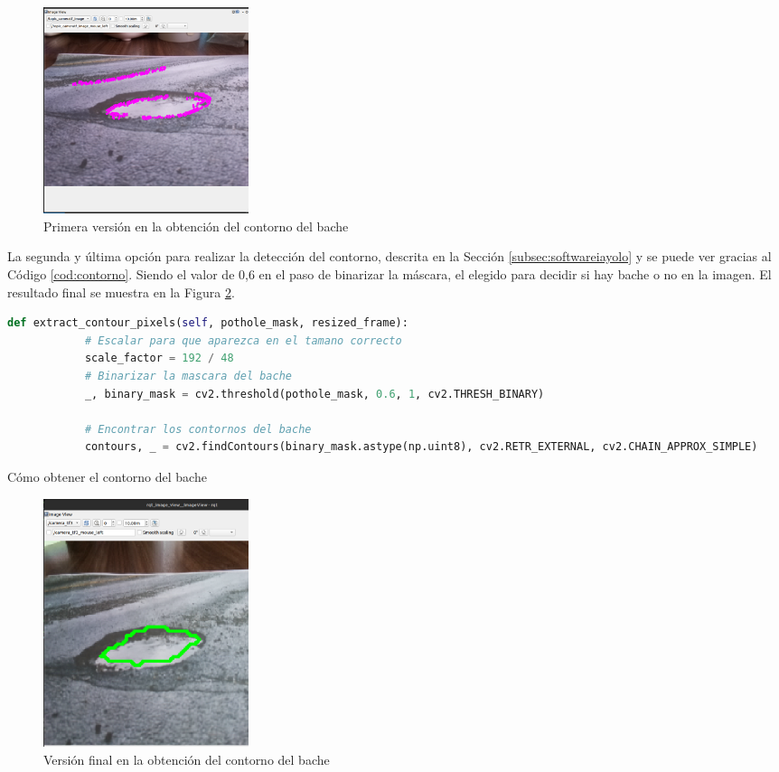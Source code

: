 \begin{figure} [h!]
	\begin{center}
			\includegraphics[width=6cm]{figs/cap7/contornoerror.png}
		\end{center}
	\caption{Primera versión en la obtención del contorno del bache}
	\label{fig:contornoerror}
\end{figure}

La segunda y última opción para realizar la detección del contorno, descrita en la Sección \ref{subsec:softwareiayolo} y se puede ver gracias al Código \ref{cod:contorno}. Siendo el valor de 0,6 en el paso de binarizar la máscara, el elegido para decidir si hay bache o no en la imagen. El resultado final se muestra en la Figura \ref{fig:contornobien}.

\begin{code}[h]
	\begin{lstlisting}[language=Python]
		def extract_contour_pixels(self, pothole_mask, resized_frame):
			# Escalar para que aparezca en el tamano correcto
			scale_factor = 192 / 48
			# Binarizar la mascara del bache
			_, binary_mask = cv2.threshold(pothole_mask, 0.6, 1, cv2.THRESH_BINARY)
		
			# Encontrar los contornos del bache
			contours, _ = cv2.findContours(binary_mask.astype(np.uint8), cv2.RETR_EXTERNAL, cv2.CHAIN_APPROX_SIMPLE)
	\end{lstlisting}
	\caption[Cómo obtener el contorno del bache]{Cómo obtener el contorno del bache}
	\label{cod:contorno}
\end{code}

 
 \begin{figure} [h!]
 	\begin{center}
 		\includegraphics[width=6cm]{figs/cap6/contornobache1.png}
 	\end{center}
 	\caption{Versión final en la obtención del contorno del bache}
 	\label{fig:contornobien}
 \end{figure}


